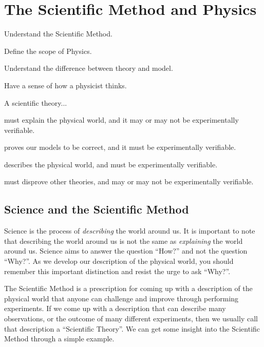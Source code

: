 \chapter{The Scientific Method and Physics}
\label{chap:introduction}

\begin{learningObjectives}
{\item Understand the Scientific Method.
\item Define the scope of Physics.
\item Understand the difference between theory and model.
\item Have a sense of how a physicist thinks.}
\end{learningObjectives}
\begin{opening}
\begin{MCquestion}{A scientific theory...}
\item must explain the physical world, and it may or may not be experimentally verifiable.
\item proves our models to be correct, and it must be experimentally verifiable.
\item describes the physical world, and must be experimentally verifiable. \correct
\item must disprove other theories, and may or may not be experimentally verifiable.
\end{MCquestion}
\end{opening}
\vspace{0.5cm}
\section{Science and the Scientific Method}
Science is the process of \textit{describing} the world around us. It is important to note that describing the world around us is not the same as \textit{explaining} the world around us. Science aims to answer the question ``How?'' and not the question ``Why?''. As we develop our description of the physical world, you should remember this important distinction and resist the urge to ask ``Why?''.

The Scientific Method is a prescription for coming up with a description of the physical world that anyone can challenge and improve through performing experiments. If we come up with a description that can describe many observations, or the outcome of many different experiments, then we usually call that description a ``Scientific Theory''. We can get some insight into the Scientific Method through a simple example. 

